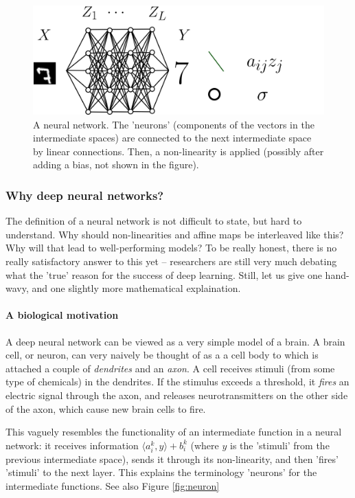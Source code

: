 \documentclass{article}
\newcommand{\sprod}[1]{\langle #1 \rangle}
\begin{document}
\begin{figure}
    \centering
    \includegraphics[width=.6\textwidth]{graphics/network_with_expl.png}
    \caption{A neural network. The 'neurons' (components of the vectors in the intermediate spaces) are connected to the next intermediate space by linear connections. Then, a non-linearity is applied (possibly after adding a bias, not shown in the figure).}
    \label{fig:MLP}
\end{figure}





\subsubsection{Why deep neural networks?} The definition of a neural network is not difficult to state, but hard to understand. Why should non-linearities and affine maps be interleaved like this? Why will that lead to well-performing models? To be really honest, there is no really satisfactory answer to this yet -- researchers are still very much debating what the 'true' reason for the success of deep learning. Still, let us give one hand-wavy, and one slightly more mathematical explaination.

\paragraph{A biological motivation} A deep neural network can be viewed as a very simple model of a brain. A brain cell, or neuron, can very naively be thought of as a a cell body to which is attached a couple of \emph{dendrites} and an \emph{axon}. A cell receives stimuli (from some type of chemicals) in the dendrites. If the stimulus exceeds a threshold, it \emph{fires} an electric signal through the axon, and releases neurotransmitters on the other side of the axon, which cause new brain cells to fire. 

This vaguely resembles the functionality of an intermediate function in a neural network: it receives information $\sprod{a^k_i,y}+b^k_i$ (where $y$ is the 'stimuli' from the previous intermediate space), sends it through its non-linearity, and then 'fires' 'stimuli' to the next layer. This explains the terminology 'neurons' for the intermediate functions. See also Figure \ref{fig:neuron}
\end{document}
